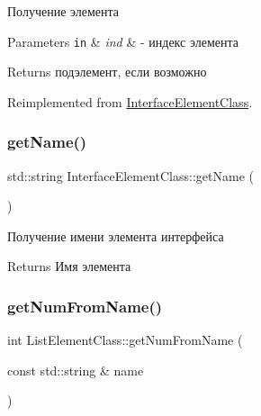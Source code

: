 Получение элемента 


\begin{DoxyParams}[1]{Parameters}
\mbox{\tt in}  & {\em ind} & -\/ индекс элемента \\
\hline
\end{DoxyParams}
\begin{DoxyReturn}{Returns}
подэлемент, если возможно 
\end{DoxyReturn}


Reimplemented from \hyperlink{class_interface_element_class_aee5a321eaf772ef561bab59b51fb36b9}{Interface\+Element\+Class}.

\mbox{\label{class_interface_element_class_a7815b1d9629ff4dc8a83c170dbb171fc}} 
\subsubsection{\texorpdfstring{get\+Name()}{getName()}}
{\footnotesize\ttfamily std\+::string Interface\+Element\+Class\+::get\+Name (\begin{DoxyParamCaption}{ }\end{DoxyParamCaption})\hspace{0.3cm}{\ttfamily [inherited]}}



Получение имени элемента интерфейса 

\begin{DoxyReturn}{Returns}
Имя элемента 
\end{DoxyReturn}
\mbox{\label{class_list_element_class_ab99933bcda68a80155f6bcfe74a6dd61}} 
\subsubsection{\texorpdfstring{get\+Num\+From\+Name()}{getNumFromName()}}
{\footnotesize\ttfamily int List\+Element\+Class\+::get\+Num\+From\+Name (\begin{DoxyParamCaption}\item[{const std\+::string \&}]{name }\end{DoxyParamCaption})\hspace{0.3cm}{\ttfamily [protected]}}



